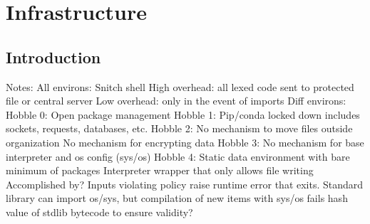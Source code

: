 \section{Infrastructure}

\thispagestyle{section_start_style}

\subsection*{Introduction}

Notes:
	All environs:
		Snitch shell
			High overhead: all lexed code sent to protected file or central server
			Low overhead: only in the event of imports
	Diff environs:
		Hobble 0:
			Open package management
		Hobble 1:
			Pip/conda locked down
			includes sockets, requests, databases, etc.
		Hobble 2:
			No mechanism to move files outside organization
			No mechanism for encrypting data
		Hobble 3:
			No mechanism for base interpreter and os config (sys/os)
		Hobble 4:
			Static data environment with bare minimum of packages
			Interpreter wrapper that only allows file writing
		Accomplished by?
			Inputs violating policy raise runtime error that exits.
			Standard library can import os/sys, but compilation of new items with sys/os fails
			hash value of stdlib bytecode to ensure validity?
